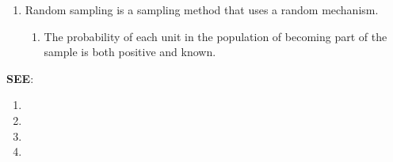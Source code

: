 \begin{enumerate}
\begin{enumerate}
        \item Random sampling is a sampling method that uses a random mechanism.
        \hfill \cite{statistics/book/Statistics-for-Data-Scientists/Maurits-Kaptein}

        \begin{enumerate}
            \item The probability of each unit in the population of becoming part of the sample is both positive and known.
            \hfill \cite{statistics/book/Statistics-for-Data-Scientists/Maurits-Kaptein}
        \end{enumerate}
    \end{enumerate}

    \vspace{0.2cm}
    \textbf{SEE}:
    \begin{enumerate}
        \item {}
        \item {}
        \item {}
        \item {}
    \end{enumerate}
\end{enumerate}

\clearpage




\clearpage


\clearpage


\clearpage


\clearpage



\clearpage


















